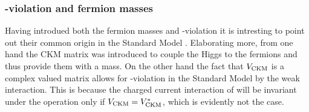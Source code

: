 \subsubsection{\CP-violation and fermion masses}
Having introdued both the fermion masses and \CP-violation it is intresting to point out their common origin in 
the Standard Model \cite{KM-mechanism}. Elaborating more, from one hand the CKM matrix was introduced to couple 
the Higgs to the fermions and thus provide them with a mass. On the other hand the fact that $V_{\rm CKM}$ is a 
complex valued matrix allows for \CP-violation in the Standard Model by the weak interaction. This is because 
the charged current interaction of  will be invariant under the \CP operation only 
if $V_{\rm CKM}=V_{\rm CKM}^*$, which is evidently not the case.

